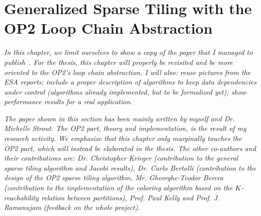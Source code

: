 \chapter{Generalized Sparse Tiling with the OP2 Loop Chain Abstraction}
\label{ch:sparsetiling}

\textit{In this chapter, we limit ourselves to show a copy of the paper that I managed to publish~\citep{Luporini-tiling}. For the thesis, this chapter will properly be revisited and be more oriented to the OP2's loop chain abstraction. I will also: reuse pictures from the ESA reports; include a proper description of algorithms to keep data dependencies under control (algorithms already implemented, but to be formalized yet); show performance results for a real application.}

\textit{The paper shown in this section has been mainly written by myself and Dr. Michelle Strout. The OP2 part, theory and implementation, is the result of my research activity. We emphasize that this chapter only marginally touches the OP2 part, which will instead be elaborated in the thesis. The other co-authors and their contributions are: Dr. Christopher Krieger (contribution to the general sparse tiling algorithm and Jacobi results), Dr. Carlo Bertolli (contribution to the design of the OP2 sparse tiling algorithm, Mr. Gheorghe-Teodor Bercea (contribution to the implementation of the coloring algorithm based on the $K$-reachability relation between partitions), Prof. Paul Kelly and Prof. J. Ramanujam (feedback on the whole project).}

